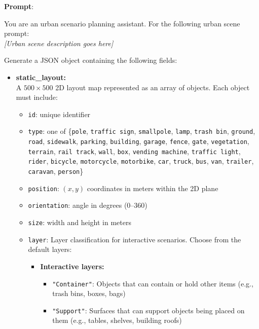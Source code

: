 \documentclass{article}
\begin{document}
\begin{tcolorbox}[examplebox, title=Scene Specification Format]

\textbf{Prompt}:

You are an urban scenario planning assistant. For the following urban scene prompt:\\

\emph{[Urban scene description goes here]}

\vspace{1em}
\noindent Generate a JSON object containing the following fields:
\begin{itemize}
    \item \textbf{static\_layout:} \\
    A $500 \times 500$ 2D layout map represented as an array of objects. Each object must include:
    \begin{itemize}
        \item \texttt{id}: unique identifier
        \item \texttt{type}: one of \{\texttt{pole}, \texttt{traffic sign}, \texttt{smallpole}, \texttt{lamp}, \texttt{trash bin}, \texttt{ground}, \texttt{road}, \texttt{sidewalk}, \texttt{parking}, \texttt{building}, \texttt{garage}, \texttt{fence}, \texttt{gate}, \texttt{vegetation}, \texttt{terrain}, \texttt{rail track}, \texttt{wall}, \texttt{box}, \texttt{vending machine}, \texttt{traffic light}, \texttt{rider}, \texttt{bicycle}, \texttt{motorcycle}, \texttt{motorbike}, \texttt{car}, \texttt{truck}, \texttt{bus}, \texttt{van}, \texttt{trailer}, \texttt{caravan}, \texttt{person}\}
        \item \texttt{position}: $(x, y)$ coordinates in meters within the 2D plane
        \item \texttt{orientation}: angle in degrees (0--360)
        \item \texttt{size}: width and height in meters
        \item \texttt{layer}: Layer classification for interactive scenarios. Choose from the default layers: 
        \begin{itemize}
            \item \textbf{Interactive layers:} 
            \begin{itemize}
                \item \texttt{"Container"}: Objects that can contain or hold other items (e.g., trash bins, boxes, bags)
                \item \texttt{"Support"}: Surfaces that can support objects being placed on them (e.g., tables, shelves, building roofs)

\end{itemize}
\end{itemize}
\end{itemize}
\end{itemize}
\end{tcolorbox}
\end{document}
